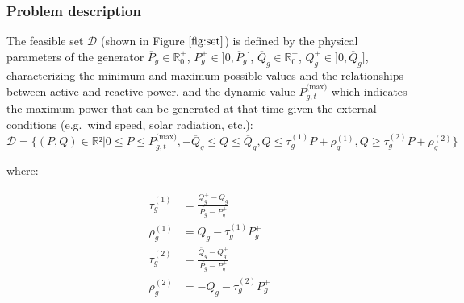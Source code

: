 \documentclass[
]{article}
\begin{document}
\subsubsection{Problem description}\label{problem-description}

The feasible set \(\mathcal{D}\) (shown in Figure \(\ref{fig:set}\)) is
defined by the physical parameters of the generator
\(\overline{P}_g \in \mathbb{R}_0^+\),
\(P^+_g \in ]0, \overline{P}_g]\),
\(\overline{Q}_g \in \mathbb{R}_0^+\),
\(Q^+_g \in ]0, \overline{Q}_g]\), characterizing the minimum and
maximum possible values and the relationships between active and
reactive power, and the dynamic value \(P^{\textrm{(max)}}_{g,t}\) which
indicates the maximum power that can be generated at that time given the
external conditions (e.g.~wind speed, solar radiation, etc.):
\begin{equation}
\mathcal{D} = \{(P, Q) \in \mathbb{R}² | 0 \leq P \leq P^{\textrm{(max)}}_{g,t}, -\overline{Q}_g \leq Q \leq \overline{Q}_g, Q \leq \tau^{(1)}_g P + \rho_g^{(1)}, Q \geq \tau^{(2)}_g P + \rho_g^{(2)}\}
\end{equation}

where:

\begin{align}
    \tau^{(1)}_g &= \frac{Q_g^+ - \overline{Q}_g}{\overline{P_g} - P_g^+}\\
    \rho^{(1)}_g &= \overline{Q}_g - \tau^{(1)}_gP_g^+\\
    \tau^{(2)}_g &= \frac{\overline{Q}_g -Q_g^+ }{\overline{P_g} - P_g^+}\\
    \rho^{(2)}_g &= -\overline{Q}_g - \tau^{(2)}_gP_g^+  \\
\end{align}
\end{document}
